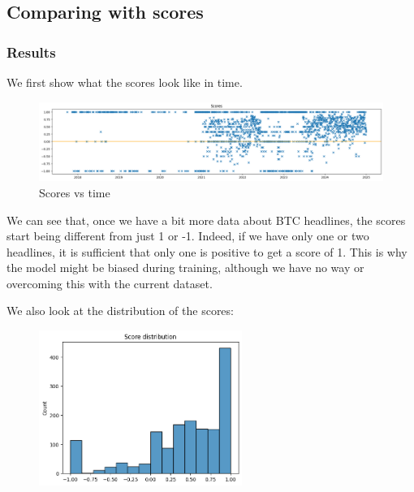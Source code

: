 \documentclass[
  a4paper]{article}
\begin{document}
\hypertarget{comparing-with-scores}{%
\subsection{Comparing with scores}\label{comparing-with-scores}}

\hypertarget{results}{%
\subsubsection{Results}\label{results}}

We first show what the scores look like in time.

\begin{figure}

{\centering \includegraphics{graphs/scores_vs_time.png}

}

\caption{Scores vs time}

\end{figure}

We can see that, once we have a bit more data about BTC headlines, the
scores start being different from just 1 or -1. Indeed, if we have only
one or two headlines, it is sufficient that only one is positive to get
a score of 1. This is why the model might be biased during training,
although we have no way or overcoming this with the current dataset.

We also look at the distribution of the scores:

\begin{figure}

{\centering \includegraphics[width=2.60417in,height=\textheight]{graphs/scores_distrib.png}

}

\end{figure}
\end{document}
